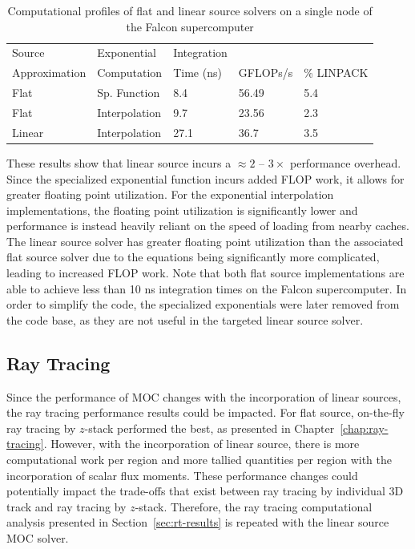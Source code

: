 \begin{table}[ht]
	\centering
	\caption{Computational profiles of flat and linear source solvers on a single node of the Falcon supercomputer}
	\medskip
	\begin{tabular}{l|l|l|l|l}
		\hline
		Source & Exponential & Integration & & \\
		Approximation & Computation & Time (ns) & GFLOPs/s & \% LINPACK \\
		\hline
		Flat & Sp. Function & 8.4 & 56.49 & 5.4 \\
		Flat & Interpolation & 9.7 & 23.56 & 2.3 \\
		Linear & Interpolation & 27.1 & 36.7 & 3.5 \\
		\hline
	\end{tabular}
	\label{tab:exp-performance}
\end{table}

These results show that linear source incurs a $\approx 2$ -- $3\times$ performance overhead. Since the specialized exponential function incurs added \ac{FLOP} work, it allows for greater floating point utilization. For the exponential interpolation implementations, the floating point utilization is significantly lower and performance is instead heavily reliant on the speed of loading from nearby caches. The linear source solver has greater floating point utilization than the associated flat source solver due to the equations being significantly more complicated, leading to increased \ac{FLOP} work. Note that both flat source implementations are able to achieve less than 10 ns integration times on the Falcon supercomputer. In order to simplify the code, the specialized exponentials were later removed from the code base, as they are not useful in the targeted linear source solver.

\subsection{Ray Tracing}

Since the performance of \ac{MOC} changes with the incorporation of linear sources, the ray tracing performance results could be impacted. For flat source, on-the-fly ray tracing by $z$-stack performed the best, as presented in Chapter~\ref{chap:ray-tracing}. However, with the incorporation of linear source, there is more computational work per region and more tallied quantities per region with the incorporation of scalar flux moments. These performance changes could potentially impact the trade-offs that exist between ray tracing by individual 3D track and ray tracing by $z$-stack. Therefore, the ray tracing computational analysis presented in Section~\ref{sec:rt-results} is repeated with the linear source \ac{MOC} solver. 

